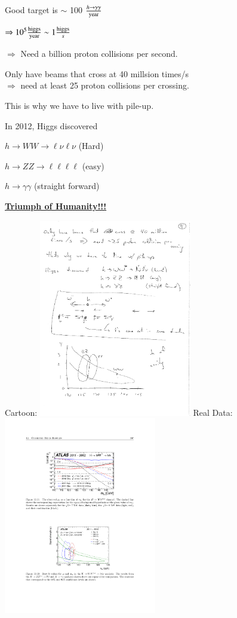 {Good target is $\sim$ 100 $\frac{h\rightarrow\gamma \gamma}{\textrm{year}}$

$\Rightarrow 10^5 \frac{\textrm{higgs}}{\textrm{year}} \sim 1 \frac{\textrm{higgs}}{s}$ 

$\Rightarrow$ Need a billion proton collisions per second.

\clearpage

Only have beams that cross at 40 millsion times/s\\
 $\Rightarrow$ need at least 25 proton collisions per crossing. 

This is why we have to live with pile-up. 

In 2012, Higgs discovered 
\bi
\item[-]$ h\rightarrow WW \rightarrow \ell \nu \ell \nu$ (Hard)
\item[-]$ h\rightarrow ZZ \rightarrow \ell \ell \ell \ell$  (easy)
\item[-]$ h\rightarrow \gamma\gamma$  (straight forward)
\ei

\textbf{\underline{Triumph of Humanity!!!}}

Cartoon:
\bc
\includegraphics[width=0.5\textwidth]{./HiggsDiscovery2.pdf}
\ec
Real Data:
\bc
\includegraphics[width=0.5\textwidth]{./BannaPlot.pdf}
\ec

}
